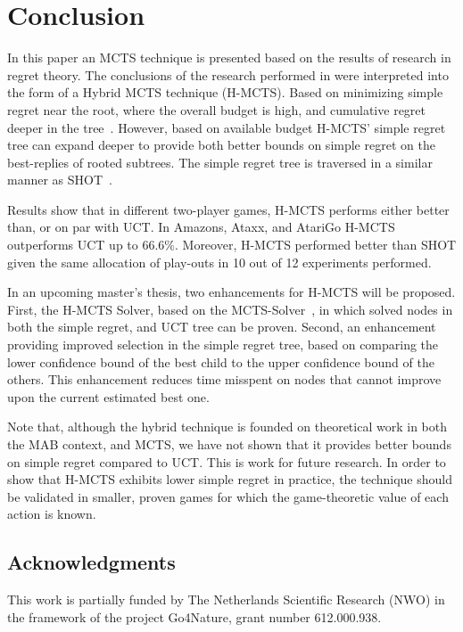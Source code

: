 \documentclass[a4paper]{llncs}
\begin{document}
\section{Conclusion}
\label{sec:concl}
In this paper an MCTS technique is presented based on the results of research in regret theory. The conclusions of the research performed in \cite{Bubeck11Pure} were interpreted into the form of a Hybrid MCTS technique (H-MCTS). Based on minimizing simple regret near the root, where the overall budget is high, and cumulative regret deeper in the tree~\cite{tolpin2012mcts}. However, based on available budget H-MCTS' simple regret tree can expand deeper to provide both better bounds on simple regret on the best-replies of rooted subtrees. The simple regret tree is traversed in a similar manner as SHOT~\cite{Cazenave14SHOT}.

Results show that in different two-player games, H-MCTS performs either better than, or on par with UCT. In Amazons, Ataxx, and AtariGo H-MCTS outperforms UCT up to 66.6\%. Moreover, H-MCTS performed better than SHOT given the same allocation of play-outs in 10 out of 12 experiments performed.

In an upcoming master's thesis, two enhancements for H-MCTS will be proposed. First, the H-MCTS Solver, based on the MCTS-Solver~\cite{Winands2008}, in which solved nodes in both the simple regret, and UCT tree can be proven. Second, an enhancement providing improved selection in the simple regret tree, based on comparing the lower confidence bound of the best child to the upper confidence bound of the others. This enhancement reduces time misspent on nodes that cannot improve upon the current estimated best one.

Note that, although the hybrid technique is founded on theoretical work in both the MAB context, and MCTS, we have not shown that it provides better bounds on simple regret compared to UCT. This is work for future research. In order to show that H-MCTS exhibits lower simple regret in practice, the technique should be validated in smaller, proven games for which the game-theoretic value of each action is known.

\subsection*{Acknowledgments} 
This work is partially funded by The Netherlands Scientific Research (NWO) in the framework of the project Go4Nature, grant number 612.000.938.



\end{document}
